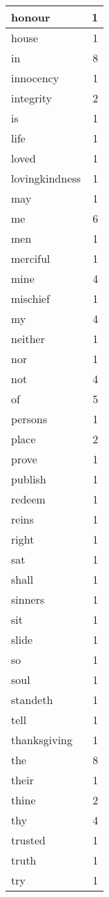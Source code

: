 \begin{center}
\begin{longtable}{l|r}
honour & 1 \\ \hline
house & 1 \\ \hline
in & 8 \\ \hline
innocency & 1 \\ \hline
integrity & 2 \\ \hline
is & 1 \\ \hline
life & 1 \\ \hline
loved & 1 \\ \hline
lovingkindness & 1 \\ \hline
may & 1 \\ \hline
me & 6 \\ \hline
men & 1 \\ \hline
merciful & 1 \\ \hline
mine & 4 \\ \hline
mischief & 1 \\ \hline
my & 4 \\ \hline
neither & 1 \\ \hline
nor & 1 \\ \hline
not & 4 \\ \hline
of & 5 \\ \hline
persons & 1 \\ \hline
place & 2 \\ \hline
prove & 1 \\ \hline
publish & 1 \\ \hline
redeem & 1 \\ \hline
reins & 1 \\ \hline
right & 1 \\ \hline
sat & 1 \\ \hline
shall & 1 \\ \hline
sinners & 1 \\ \hline
sit & 1 \\ \hline
slide & 1 \\ \hline
so & 1 \\ \hline
soul & 1 \\ \hline
standeth & 1 \\ \hline
tell & 1 \\ \hline
thanksgiving & 1 \\ \hline
the & 8 \\ \hline
their & 1 \\ \hline
thine & 2 \\ \hline
thy & 4 \\ \hline
trusted & 1 \\ \hline
truth & 1 \\ \hline
try & 1 \\ \hline

\end{longtable}
\end{center}
